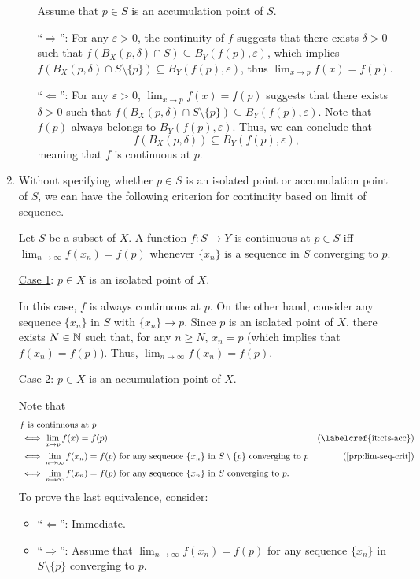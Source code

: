 \begin{enumerate}
\begin{enumerate}
\begin{pf}
Assume that \(p\in S\) is an accumulation point of \(S\).

``\(\Rightarrow\)'': For any \(\varepsilon>0\), the continuity of \(f\)
suggests that there exists \(\delta>0\) such that \(f(B_X(p,\delta)\cap S)\subseteq
B_Y(f(p),\varepsilon)\), which implies \(f(B_X(p,\delta)\cap S\setminus \{p\})\subseteq
B_Y(f(p),\varepsilon)\), thus \(\lim_{x\to p}f(x)=f(p)\).

``\(\Leftarrow\)'': For any \(\varepsilon>0\), \(\lim_{x\to p}f(x)=f(p)\)
suggests that there exists \(\delta>0\) such that \(f(B_X(p,\delta)\cap S\setminus
\{p\})\subseteq B_Y(f(p),\varepsilon)\). Note that \(f(p)\) always belongs to
\(B_Y(f(p),\varepsilon)\). Thus, we can conclude that
\[
f(B_X(p,\delta))\subseteq B_Y(f(p),\varepsilon),
\]
meaning that \(f\) is continuous at \(p\).
\end{pf}
\end{enumerate}
\item Without specifying whether \(p\in S\) is an isolated point or
accumulation point of \(S\), we can have the following criterion for
continuity based on limit of sequence.

\begin{proposition}
\label{prp:cts-seq-lim-crit}
Let \(S\) be a subset of \(X\).  A function \(f:S\to Y\) is continuous at
\(p\in S\) iff \(\lim_{n\to \infty}f(x_n)=f(p)\) whenever \(\{x_n\}\) is a
sequence in \(S\) converging to \(p\).
\end{proposition}
\begin{pf}
\underline{Case 1}: \(p\in X\) is an isolated point of \(X\).

In this case, \(f\) is always continuous at \(p\). On the other hand, consider
any sequence \(\{x_n\}\) in \(S\) with \(\{x_n\}\to p\). Since \(p\) is an
isolated point of \(X\), there exists \(N\in\mathbb{N}\) such that, for any \(n\ge N\),
\(x_n=p\) (which implies that \(f(x_n)=f(p)\)). Thus, \(\lim_{n\to
\infty}f(x_n)=f(p)\).

\underline{Case 2}: \(p\in X\) is an accumulation point of \(X\).

Note that
\begin{align*}
&\text{\(f\) is continuous at \(p\)}\\
&\iff \lim_{x\to p}f(x)=f(p)&\text{(\labelcref{it:cts-acc})}\\
&\iff \lim_{n\to \infty}f(x_n)=f(p)\text{ for any sequence \(\{x_n\}\) in
\(S\setminus \{p\}\) converging to \(p\)}&\text{(\Cref{prp:lim-seq-crit})}\\
&\iff \lim_{n\to \infty}f(x_n)=f(p)\text{ for any sequence \(\{x_n\}\) in
\(S\) converging to \(p\)}.
\end{align*}
To prove the last equivalence, consider:
\begin{itemize}
\item ``\(\Leftarrow\)'': Immediate.
\item ``\(\Rightarrow\)'': Assume that \(\lim_{n\to \infty}f(x_n)=f(p)\) for
any sequence \(\{x_n\}\) in \(S\setminus \{p\}\) converging to \(p\).


\end{itemize}
\end{pf}
\end{enumerate}
